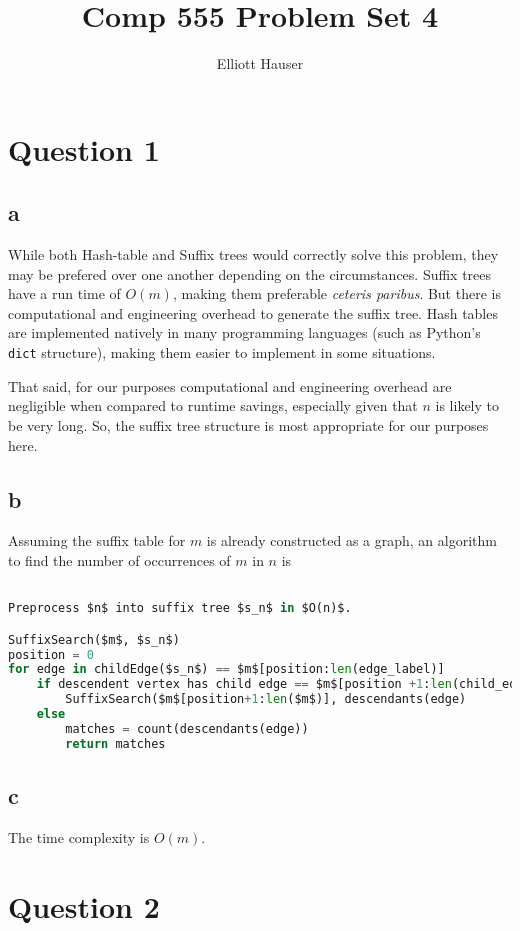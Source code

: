 \documentclass[12pt]{article}
\author{Elliott Hauser}
\title{Comp 555 Problem Set 4}
\begin{document}
\maketitle
\section*{Question 1}
\subsection*{a}  While both Hash-table and Suffix trees would correctly solve this problem, they may be prefered over one another depending on the circumstances.  Suffix trees have a run time of $O(m)$, making them preferable \textit{ceteris paribus}.  But there is computational and engineering overhead to generate the suffix tree. Hash tables are implemented natively in many programming languages (such as Python's \lstinline{dict} structure), making them easier to implement in some situations.

That said, for our purposes computational and engineering overhead are negligible when compared to runtime savings, especially given that $n$ is likely to be very long.  So, the suffix tree structure is most appropriate for our purposes here.

\subsection*{b} Assuming the suffix table for $m$ is already constructed as a graph, an algorithm to find the number of occurrences of $m$ in $n$ is
\begin{lstlisting}[language=python, mathescape=true]

Preprocess $n$ into suffix tree $s_n$ in $O(n)$.

SuffixSearch($m$, $s_n$)
position = 0
for edge in childEdge($s_n$) == $m$[position:len(edge_label)]
	if descendent vertex has child edge == $m$[position +1:len(child_edge_label)]
		SuffixSearch($m$[position+1:len($m$)], descendants(edge)
	else
		matches = count(descendants(edge))
		return matches

\end{lstlisting}

\subsection*{c}  The time complexity is %
$O(m)$.

\section*{Question 2}
\end{document}
